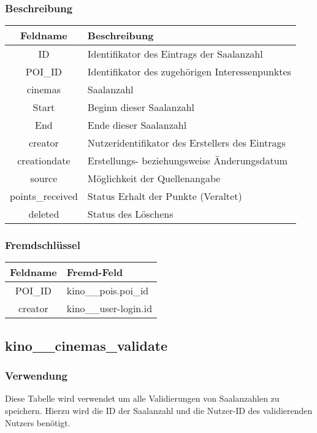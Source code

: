 \subsubsection{Beschreibung}
\begin{table}[H]
	\begin{tabular}{|c|p{12cm}|}
		\hline
		\textbf{Feldname} & \textbf{Beschreibung} \\ \hline
		ID & Identifikator des Eintrags der Saalanzahl \\ \hline
		POI\_ID & Identifikator des zugehörigen Interessenpunktes \\ \hline
		cinemas & Saalanzahl \\ \hline
		Start & Beginn dieser Saalanzahl \\ \hline
		End & Ende dieser Saalanzahl \\ \hline
		creator & Nutzeridentifikator des Erstellers des Eintrags \\ \hline
		creationdate & Erstellungs- beziehungsweise Änderungsdatum \\ \hline
		source & Möglichkeit der Quellenangabe \\ \hline
		points\_received & Status Erhalt der Punkte (Veraltet) \\ \hline
		deleted & Status des Löschens \\ \hline
	\end{tabular}
\end{table}
\subsubsection{Fremdschlüssel}
\begin{table}[H]
	\begin{tabular}{|c|p{12.5cm}|}
		\hline
		\textbf{Feldname} & \textbf{Fremd-Feld} \\ \hline
		POI\_ID & kino\_\_pois.poi\_id \\ \hline
		creator & kino\_\_user-login.id \\ \hline
	\end{tabular}
\end{table}
\subsection{kino\_\_cinemas\_validate}
\subsubsection{Verwendung} Diese Tabelle wird verwendet um alle Validierungen von Saalanzahlen zu speichern. Hierzu wird die ID der Saalanzahl und die Nutzer-ID des validierenden Nutzers benötigt.

